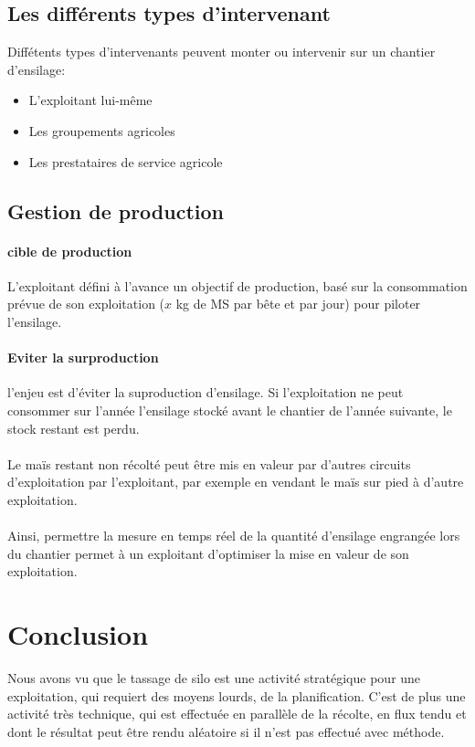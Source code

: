 \documentclass[12pt,a4paper]{report}
\begin{document}
\subsection{Les différents types d'intervenant}
Diffétents types d'intervenants peuvent monter ou intervenir sur un chantier d'ensilage:
\begin{itemize}
	\item L'exploitant lui-même
	\item Les groupements agricoles
	\item Les prestataires de service agricole
\end{itemize}


\subsection{Gestion de production}
\paragraph{cible de production} L'exploitant défini à l'avance un objectif de production, basé sur la consommation prévue de son exploitation ($x$ kg de MS par bête et par jour) pour piloter l'ensilage.

\paragraph{Eviter la surproduction} l'enjeu est d'éviter la suproduction d'ensilage. Si l'exploitation ne peut consommer sur l'année l'ensilage stocké avant le chantier de l'année suivante, le stock restant est perdu. 

\paragraph{}
Le maïs restant non récolté peut être mis en valeur par d'autres circuits d'exploitation par l'exploitant, par exemple en vendant le maïs sur pied à d'autre exploitation.

\paragraph{} Ainsi, permettre la mesure en temps réel de la quantité d'ensilage engrangée lors du chantier permet à un exploitant d'optimiser la mise en valeur de son exploitation.



\section{Conclusion}
Nous avons vu que le tassage de silo est une activité stratégique pour une exploitation, qui requiert des moyens lourds, de la planification. C'est de plus une activité très technique, qui est effectuée en parallèle de la récolte, en flux tendu et dont le résultat peut être rendu aléatoire si il n'est pas effectué avec méthode.
\end{document}

